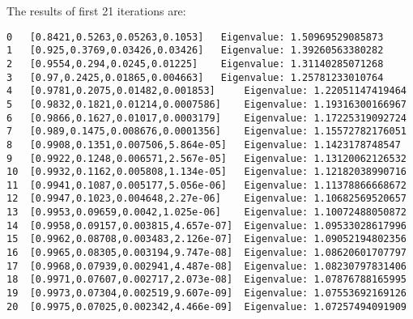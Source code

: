 \documentclass{article}
\begin{document}
\begin{enumerate}
The results of first 21 iterations are: 
\begin{verbatim}
0	[0.8421,0.5263,0.05263,0.1053]	 Eigenvalue: 1.50969529085873
1	[0.925,0.3769,0.03426,0.03426]	 Eigenvalue: 1.39260563380282
2	[0.9554,0.294,0.0245,0.01225]	 Eigenvalue: 1.31140285071268
3	[0.97,0.2425,0.01865,0.004663]	 Eigenvalue: 1.25781233010764
4	[0.9781,0.2075,0.01482,0.001853]	 Eigenvalue: 1.22051147419464
5	[0.9832,0.1821,0.01214,0.0007586]	 Eigenvalue: 1.19316300166967
6	[0.9866,0.1627,0.01017,0.0003179]	 Eigenvalue: 1.17225319092724
7	[0.989,0.1475,0.008676,0.0001356]	 Eigenvalue: 1.15572782176051
8	[0.9908,0.1351,0.007506,5.864e-05]	 Eigenvalue: 1.1423178748547
9	[0.9922,0.1248,0.006571,2.567e-05]	 Eigenvalue: 1.13120062126532
10	[0.9932,0.1162,0.005808,1.134e-05]	 Eigenvalue: 1.12182038990716
11	[0.9941,0.1087,0.005177,5.056e-06]	 Eigenvalue: 1.11378866668672
12	[0.9947,0.1023,0.004648,2.27e-06]	 Eigenvalue: 1.10682569520657
13	[0.9953,0.09659,0.0042,1.025e-06]	 Eigenvalue: 1.10072488050872
14	[0.9958,0.09157,0.003815,4.657e-07]	 Eigenvalue: 1.09533028617996
15	[0.9962,0.08708,0.003483,2.126e-07]	 Eigenvalue: 1.09052194802356
16	[0.9965,0.08305,0.003194,9.747e-08]	 Eigenvalue: 1.08620601707797
17	[0.9968,0.07939,0.002941,4.487e-08]	 Eigenvalue: 1.08230797831406
18	[0.9971,0.07607,0.002717,2.073e-08]	 Eigenvalue: 1.07876788165995
19	[0.9973,0.07304,0.002519,9.607e-09]	 Eigenvalue: 1.07553692169126
20	[0.9975,0.07025,0.002342,4.466e-09]	 Eigenvalue: 1.07257494091909
\end{verbatim} 
\end{enumerate} 
\end{document}
